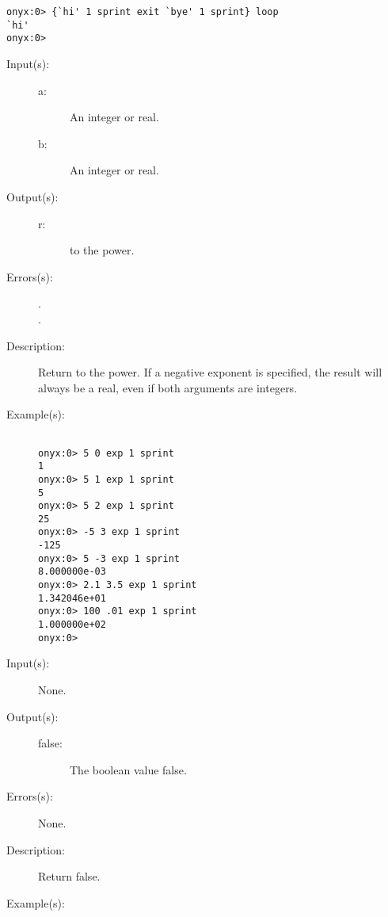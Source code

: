 \begin{description}
\begin{description}
\begin{verbatim}
onyx:0> {`hi' 1 sprint exit `bye' 1 sprint} loop
`hi'
onyx:0>
		\end{verbatim}
	\end{description}
\label{systemdict:exp}
\item[{\onyxop{a b}{exp}{r}}: ]
	\begin{description}\item[]
	\item[Input(s): ]
		\begin{description}\item[]
		\item[a: ]
			An integer or real.
		\item[b: ]
			An integer or real.
		\end{description}
	\item[Output(s): ]
		\begin{description}\item[]
		\item[r: ]
			 to the  power.
		\end{description}
	\item[Errors(s): ]
		\begin{description}\item[]
		\item[.]
		\item[.]
		\end{description}
	\item[Description: ]
		Return  to the  power.  If a negative exponent
		is specified, the result will always be a real, even if both
		arguments are integers.
	\item[Example(s): ]\begin{verbatim}

onyx:0> 5 0 exp 1 sprint
1
onyx:0> 5 1 exp 1 sprint
5
onyx:0> 5 2 exp 1 sprint
25
onyx:0> -5 3 exp 1 sprint
-125
onyx:0> 5 -3 exp 1 sprint
8.000000e-03
onyx:0> 2.1 3.5 exp 1 sprint
1.342046e+01
onyx:0> 100 .01 exp 1 sprint
1.000000e+02
onyx:0>
		\end{verbatim}
	\end{description}
\label{systemdict:false}
\item[{\onyxop{--}{false}{false}}: ]
	\begin{description}\item[]
	\item[Input(s): ] None.
	\item[Output(s): ]
		\begin{description}\item[]
		\item[false: ]
			The boolean value false.
		\end{description}
	\item[Errors(s): ] None.
	\item[Description: ]
		Return false.
	\item[Example(s): ]\begin{verbatim}


\end{verbatim}
\end{description}
\end{description}
